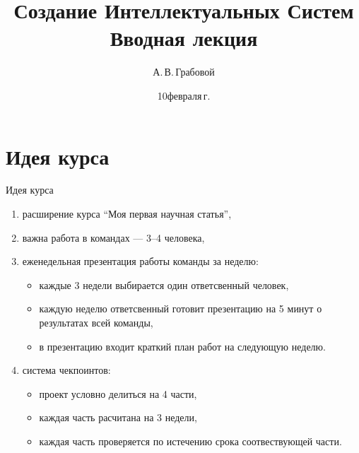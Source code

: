 \documentclass[10pt,pdf,hyperref={unicode}]{beamer}
\title[Вводная лекция]{Создание Интеллектуальных Систем \\ Вводная лекция}
\author{А.\,В.\,Грабовой}
\institute[]{Московский физико-технический институт}
\date[2022]{\small 10\;февраля\;2022\,г.}
\begin{document}
\begin{frame}
\titlepage
\end{frame}

\section{Идея курса}
\begin{frame}{Идея курса}
\bigskip
\begin{enumerate}[1)]
\justifying
\item расширение курса ``Моя первая научная статья'',
\item важна работа в командах --- 3--4 человека,
\item еженедельная презентация работы команды за неделю:
    \begin{itemize}
    \justifying
        \item каждые 3 недели выбирается один ответсвенный человек,
        \item каждую неделю ответсвенный готовит презентацию на 5 минут о результатах всей команды,
        \item в презентацию входит краткий план работ на следующую неделю.
    \end{itemize}
\item система чекпоинтов:
    \begin{itemize}
    \justifying
        \item проект условно делиться на 4 части,
        \item каждая часть расчитана на 3 недели,
        \item каждая часть проверяется по истечению срока соотвествующей части.
    \end{itemize}
\end{enumerate}

\end{frame}

\end{document}
